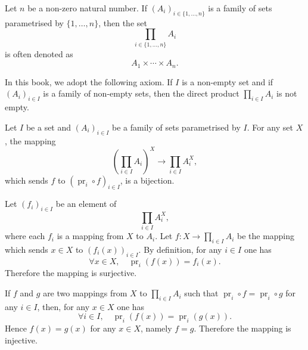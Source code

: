 \begin{notationenv}
Let $n$ be a non-zero natural number. If $(A_i)_{i \in \{1,  \ldots,  n\}}$ is a family of sets parametrised by $\{1,  \ldots,  n\}$,  then the set
\[
\prod_{i \in \{1,  \ldots,  n\}} A_i
\]
is often denoted as
\[
A_1 \times \cdots \times A_n.
\]
\end{notationenv}

\begin{axiomenv}
In this book,  we adopt the following axiom. If $I$ is a non-empty set and if $(A_i)_{i \in I}$ is a family of non-empty sets,  then the direct product $\prod_{i \in I} A_i$ is not empty.
\end{axiomenv}
\begin{propositionenv}\label{3.9.3}
\label{prop:direct-product-bijection}
Let $I$ be a set and $(A_i)_{i \in I}$ be a family of sets parametrised by $I$. For any set $X$,  the mapping
\[
\left( \prod_{i \in I} A_i \right)^X \longrightarrow \prod_{i \in I} A_i^X, 
\]
which sends $f$ to $(\operatorname{pr}_i \circ f)_{i \in I}$,  is a bijection.



\begin{center}
\end{center}
\end{propositionenv}
\begin{proofenv}
Let $(f_i)_{i \in I}$ be an element of
\[
\prod_{i \in I} A_i^X, 
\]
where each $f_i$ is a mapping from $X$ to $A_i$. Let $f : X \to \prod_{i \in I} A_i$ be the mapping which sends $x \in X$ to $(f_i(x))_{i \in I}$. By definition,  for any $i \in I$ one has
\[
\forall x \in X,  \quad \operatorname{pr}_i(f(x)) = f_i(x).
\]
Therefore the mapping is surjective.

If $f$ and $g$ are two mappings from $X$ to $\prod_{i \in I} A_i$ such that $\operatorname{pr}_i \circ f = \operatorname{pr}_i \circ g$ for any $i \in I$,  then,  for any $x \in X$ one has
\[
\forall i \in I,  \quad \operatorname{pr}_i(f(x)) = \operatorname{pr}_i(g(x)).
\]
Hence $f(x) = g(x)$ for any $x \in X$,  namely $f = g$. Therefore the mapping is injective.
\end{proofenv}

